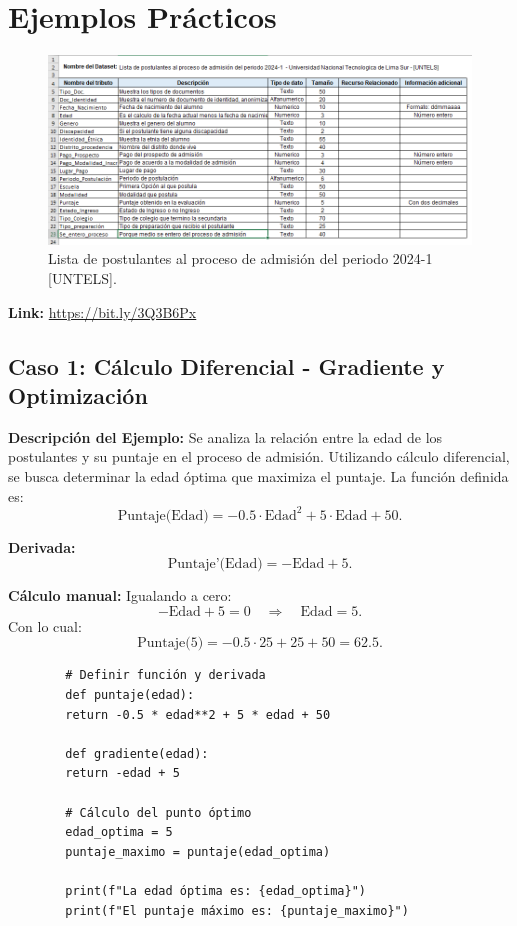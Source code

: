 \documentclass[12pt,a4,oneside]{book}
\begin{document}
	\section{Ejemplos Prácticos}
	
	\begin{figure}[H]
		\centering
		\includegraphics[width=1\textwidth]{bd cap.png}
		\caption{Lista de postulantes al proceso de admisión del periodo 2024-1 [UNTELS].}
		\label{fig:imagen}
	\end{figure}
	
	\textbf{Link:} \url{https://bit.ly/3Q3B6Px}
	
	\subsection{Caso 1: Cálculo Diferencial - Gradiente y Optimización}
	
	\textbf{Descripción del Ejemplo:}  
	Se analiza la relación entre la edad de los postulantes y su puntaje en el proceso de admisión. Utilizando cálculo diferencial, se busca determinar la edad óptima que maximiza el puntaje. La función definida es:
	\[
	\text{Puntaje(Edad)} = -0.5 \cdot \text{Edad}^2 + 5 \cdot \text{Edad} + 50.
	\]
	
	\textbf{Derivada:}
	\[
	\text{Puntaje'(Edad)} = -\text{Edad} + 5.
	\]
	
	\textbf{Cálculo manual:}  
	Igualando a cero:
	\[
	-\text{Edad} + 5 = 0 \quad \Rightarrow \quad \text{Edad} = 5.
	\]
	Con lo cual:
	\[
	\text{Puntaje(5)} = -0.5 \cdot 25 + 25 + 50 = 62.5.
	\]
	
	\begin{verbatim}
		# Definir función y derivada
		def puntaje(edad):
		return -0.5 * edad**2 + 5 * edad + 50
		
		def gradiente(edad):
		return -edad + 5
		
		# Cálculo del punto óptimo
		edad_optima = 5
		puntaje_maximo = puntaje(edad_optima)
		
		print(f"La edad óptima es: {edad_optima}")
		print(f"El puntaje máximo es: {puntaje_maximo}")
	\end{verbatim}
	
\end{document}
